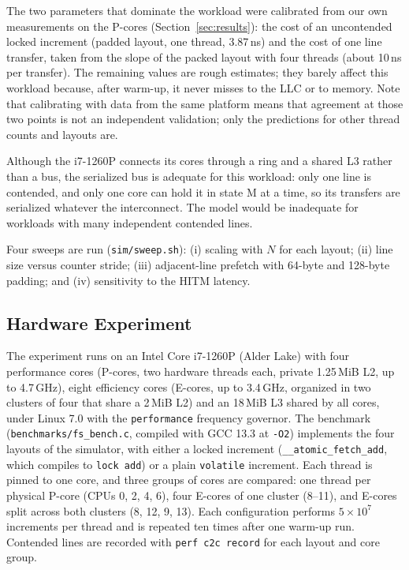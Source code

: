 \documentclass[journal]{IEEEtran}
\begin{document}
The two parameters that dominate the workload were calibrated from our own
measurements on the P-cores (Section~\ref{sec:results}): the cost of an
uncontended locked increment (padded layout, one thread, 3.87\,ns) and the
cost of one line transfer, taken from the slope of the packed layout with four
threads (about 10\,ns per transfer). The remaining values are rough estimates;
they barely affect this workload because, after warm-up, it never misses to
the LLC or to memory. Note that calibrating with data from the same platform
means that agreement at those two points is not an independent validation;
only the predictions for other thread counts and layouts are.

Although the i7-1260P connects its cores through a ring and a shared L3
rather than a bus, the serialized bus is adequate for this workload: only one
line is contended, and only one core can hold it in state M at a time, so its
transfers are serialized whatever the interconnect. The model would be
inadequate for workloads with many independent contended lines.

Four sweeps are run (\texttt{sim/sweep.sh}): (i) scaling with $N$ for each
layout; (ii) line size versus counter stride; (iii) adjacent-line prefetch with
64-byte and 128-byte padding; and (iv) sensitivity to the HITM latency.

\subsection{Hardware Experiment}
The experiment runs on an Intel Core i7-1260P (Alder Lake) with four
performance cores (P-cores, two hardware threads each, private 1.25\,MiB L2,
up to 4.7\,GHz), eight efficiency cores (E-cores, up to 3.4\,GHz, organized in
two clusters of four that share a 2\,MiB L2) and an 18\,MiB L3 shared by all cores,
under Linux 7.0 with the \texttt{performance} frequency governor. The
benchmark (\texttt{benchmarks/fs\_bench.c}, compiled with GCC 13.3 at
\texttt{-O2}) implements the four layouts of the simulator, with either a
locked increment (\texttt{\_\_atomic\_fetch\_add}, which compiles to
\texttt{lock add}) or a plain \texttt{volatile} increment. Each thread is pinned
to one core, and three groups of cores are compared: one thread per physical
P-core (CPUs 0, 2, 4, 6), four E-cores of one cluster (8--11), and E-cores
split across both clusters (8, 12, 9, 13). Each configuration performs
$5\times10^{7}$ increments per thread and is repeated ten times after one
warm-up run. Contended lines are recorded with \texttt{perf c2c record} for
each layout and core group.
\end{document}
